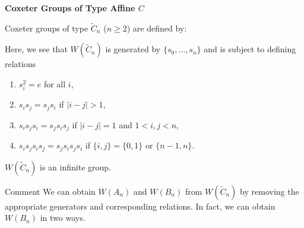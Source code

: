 \documentclass[9pt,handout]{beamer}
\newcommand{\C}{\widetilde{C}}
\begin{document}
\begin{frame}{\textbf{Coxeter Groups of Type Affine $C$}}

Coxeter groups of type $\C_{n}$ ($n \geq 2$) are defined by:
\begin{figure}
\end{figure}

\pause 
Here, we see that $W(\C_{n})$ is generated by $\{s_{0}, 
\ldots, s_{n}\}$ and is subject to defining relations
\begin{enumerate}
\item $s_{i}^{2}=e$ for all $i$,
\item $s_{i}s_{j}=s_{j}s_{i}$ if $|i-j|>1$,
\item $s_{i}s_{j}s_{i}=s_{j}s_{i}s_{j}$ if $|i-j|=1$ and $1< i,j < n$, 
\item $s_{i}s_{j}s_{i}s_{j}=s_{j}s_{i}s_{j}s_{i}$ if $\{i,j\}=\{0,1\}$ or 
$\{n-1,n\}$.
\end{enumerate}
\pause 

$W(\C_{n})$ is an infinite group.

\pause

\begin{block}{Comment}
We can obtain $W(A_{n})$ and $W(B_{n})$ from $W(\C_{n})$ by removing the 
appropriate generators and corresponding relations.  In fact, 
we can obtain $W(B_{n})$ in two ways.
\end{block}

\end{frame}

\end{document}
